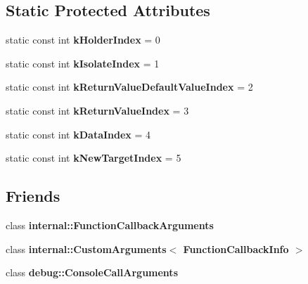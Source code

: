\subsection*{Static Protected Attributes}
\begin{DoxyCompactItemize}
\item 
\mbox{\label{classv8_1_1FunctionCallbackInfo_a073824921daf8600fb9c00c50ee8ef0c}} 
static const int {\bfseries k\+Holder\+Index} = 0
\item 
\mbox{\label{classv8_1_1FunctionCallbackInfo_a0e2fbe5a323276263c848ea8050a34eb}} 
static const int {\bfseries k\+Isolate\+Index} = 1
\item 
\mbox{\label{classv8_1_1FunctionCallbackInfo_a0b32b5613fe2f0cd139d9dffc0916d09}} 
static const int {\bfseries k\+Return\+Value\+Default\+Value\+Index} = 2
\item 
\mbox{\label{classv8_1_1FunctionCallbackInfo_abb339e201184ebe2502a1202d54201ca}} 
static const int {\bfseries k\+Return\+Value\+Index} = 3
\item 
\mbox{\label{classv8_1_1FunctionCallbackInfo_a152c34c5b2f8c55d04d6d541bf8a4544}} 
static const int {\bfseries k\+Data\+Index} = 4
\item 
\mbox{\label{classv8_1_1FunctionCallbackInfo_a23e70f4737b7e205dc91b972d75fbd9c}} 
static const int {\bfseries k\+New\+Target\+Index} = 5
\end{DoxyCompactItemize}
\subsection*{Friends}
\begin{DoxyCompactItemize}
\item 
\mbox{\label{classv8_1_1FunctionCallbackInfo_aac7268b20857fd75b69b86ded46d0f34}} 
class {\bfseries internal\+::\+Function\+Callback\+Arguments}
\item 
\mbox{\label{classv8_1_1FunctionCallbackInfo_a02d869d89b14ddd1717429c2106f955a}} 
class {\bfseries internal\+::\+Custom\+Arguments$<$ Function\+Callback\+Info $>$}
\item 
\mbox{\label{classv8_1_1FunctionCallbackInfo_aa7dc5c9ac169be8c0feb25eae56c35fe}} 
class {\bfseries debug\+::\+Console\+Call\+Arguments}
\end{DoxyCompactItemize}



